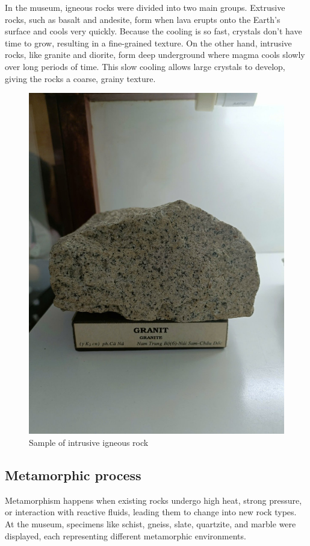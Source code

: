 In the museum, igneous rocks were divided into two main groups. Extrusive rocks, such as basalt and andesite, form when lava erupts onto the Earth's surface and cools very quickly. Because the cooling is so fast, crystals don't have time to grow, resulting in a fine-grained texture. On the other hand, intrusive rocks, like granite and diorite, form deep underground where magma cools slowly over long periods of time. This slow cooling allows large crystals to develop, giving the rocks a coarse, grainy texture.

\begin{figure}[H]
  \centering
  \includegraphics[max width=0.8\linewidth]{graphics/figure_07.jpg}
  \caption{Sample of intrusive igneous rock}
  \label{fig:intrusive-igneous}
\end{figure}

\subsection{Metamorphic process}
\label{subsec:metamorphic-process}

Metamorphism happens when existing rocks undergo high heat, strong pressure, or interaction with reactive fluids, leading them to change into new rock types. At the museum, specimens like schist, gneiss, slate, quartzite, and marble were displayed, each representing different metamorphic environments.

